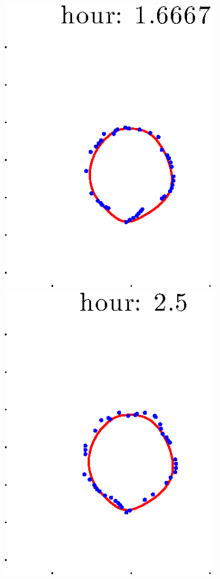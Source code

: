 \documentclass[12pt]{article}
\begin{document}
\begin{figure}[h!]
\begin{subfigure}[b]{.3\textwidth}
		\includegraphics[height=.15\textheight]{Pos14exp8/firsthalf/second3.eps}
		\includegraphics[height=.15\textheight]{Pos14exp8/firsthalf/second4.eps}

\end{subfigure}
\end{figure}
\end{document}
